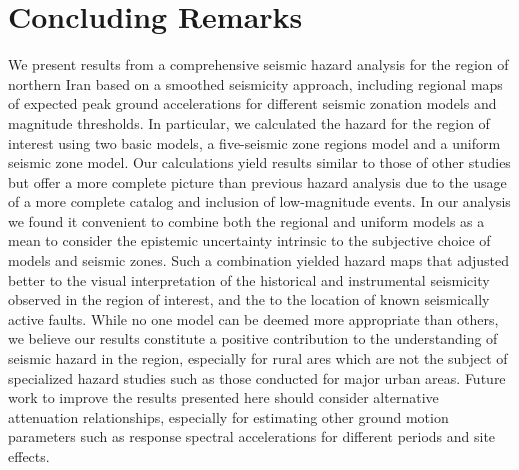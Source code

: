 
\section{Concluding Remarks}

We present results from a comprehensive seismic hazard analysis for the region of northern Iran based on a smoothed seismicity approach, including regional maps of expected peak ground accelerations for different seismic zonation models and magnitude thresholds. In particular, we calculated the hazard for the region of interest using two basic models, a five-seismic zone regions model and a uniform seismic zone model. Our calculations yield results similar to those of other studies but offer a more complete picture than previous hazard analysis due to the usage of a more complete catalog and inclusion of low-magnitude events. In our analysis we found it convenient to combine both the regional and uniform models as a mean to consider the epistemic uncertainty intrinsic to the subjective choice of models and seismic zones. Such a combination yielded hazard maps that adjusted better to the visual interpretation of the historical and instrumental seismicity observed in the region of interest, and the to the location of known seismically active faults. While no one model can be deemed more appropriate than others, we believe our results constitute a positive contribution to the understanding of seismic hazard in the region, especially for rural ares which are not the subject of specialized hazard studies such as those conducted for major urban areas. Future work to improve the results presented here should consider alternative attenuation relationships, especially for estimating other ground motion parameters such as response spectral accelerations for different periods and site effects.


